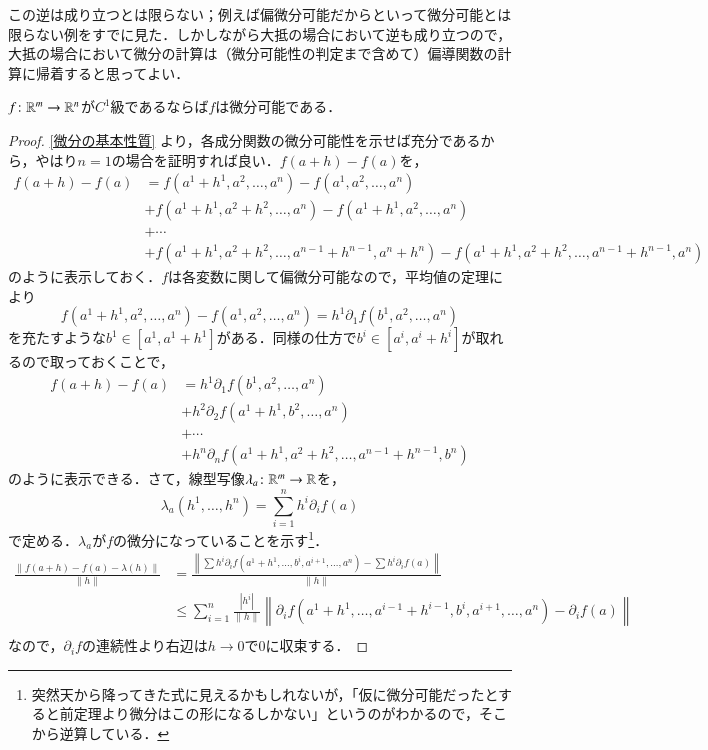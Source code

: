 この逆は成り立つとは限らない；例えば偏微分可能だからといって微分可能とは限らない例をすでに見た．しかしながら大抵の場合において逆も成り立つので，大抵の場合において微分の計算は（微分可能性の判定まで含めて）偏導関数の計算に帰着すると思ってよい．

\begin{thm}\label{C1なら微分可能}
$f \colon \mathbb{R}^m \to \mathbb{R}^n$が$C^1$級であるならば$f$は微分可能である．
\end{thm}

\begin{proof}
\cref{微分の基本性質} より，各成分関数の微分可能性を示せば充分であるから，やはり$n=1$の場合を証明すれば良い．$f(a+h) - f(a)$を，
\begin{align}
f(a+h) - f(a) &= f(a^1+h^1, a^2, \dots, a^n) - f(a^1 , a^2, \dots, a^n) \\
&+ f(a^1+h^1, a^2+h^2, \dots, a^n) - f(a^1+h^1 , a^2, \dots, a^n) \\
&+ \cdots \\
&+ f(a^1+h^1, a^2+h^2, \dots, a^{n-1}+h^{n-1} ,a^n+h^n) - f(a^1+h^1 , a^2+h^2, \dots, a^{n-1} +h^{n-1}, a^n)
\end{align}のように表示しておく．$f$は各変数に関して偏微分可能なので，平均値の定理により
\begin{equation}
f(a^1+h^1, a^2, \dots, a^n) - f(a^1 , a^2, \dots, a^n) = h^1 \partial_1 f(b^1, a^2, \dots, a^n)
\end{equation}を充たすような$b^1 \in [a^1, a^1 + h^1]$がある．同様の仕方で$b^i \in [a^i, a^i+h^i]$が取れるので取っておくことで，
\begin{align}
f(a+h) - f(a) &= h^1 \partial_1 f(b^1, a^2, \dots, a^n) \\
&+ h^2 \partial_2 f(a^1+h^1, b^2, \dots, a^n) \\
&+ \cdots \\
&+ h^n \partial_n f(a^1+h^1, a^2+h^2, \dots, a^{n-1}+h^{n-1} ,b^n)
\end{align}のように表示できる．さて，線型写像$\lambda_a \colon \mathbb{R}^m \to \mathbb{R}$を，
\begin{equation}
\lambda_a(h^1, \dots, h^n) = \sum_{i=1}^n h^i \partial_i f(a)
\end{equation}で定める．$\lambda_a$が$f$の微分になっていることを示す\footnote{突然天から降ってきた式に見えるかもしれないが，「仮に微分可能だったとすると前定理より微分はこの形になるしかない」というのがわかるので，そこから逆算している．}．
\begin{align}
\frac{\|f(a+h)- f(a) - \lambda(h)\|}{\|h\|} &= \frac{\left\| \sum h^i \partial_i f(a^1+h^1, \dots, b^i, a^{i+1}, \dots, a^n)  - \sum h^i \partial_i f(a) \right\|}{\|h\|} \\
&\leq \sum_{i=1}^n \frac{ \left|h^i\right|}{\|h\|} \left\|  \partial_i f(a^1+h^1, \dots, a^{i-1} +h^{i-1}, b^i, a^{i+1}, \dots, a^n)  -  \partial_i f(a) \right\| \\
\end{align}
なので，$\partial_i f$の連続性より右辺は$h\to 0$で0に収束する．
\end{proof}

